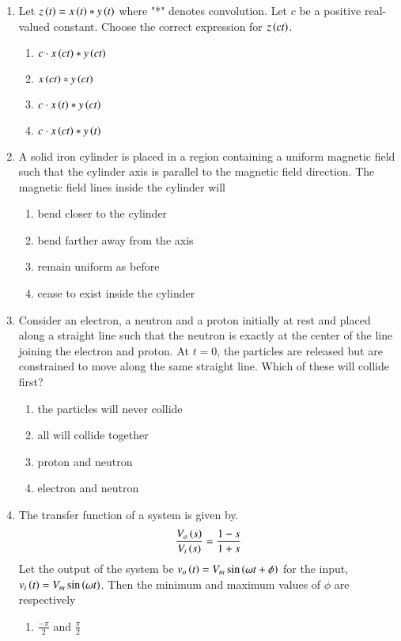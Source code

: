 \documentclass[journal,12pt,onecolumn]{IEEEtran}
\theoremstyle{remark}
\begin{document}
\begin{enumerate}
\begin{enumerate}
\end{enumerate}
\item Let $z\left(t\right)=x\left(t\right)*y\left(t\right)$ where "*" denotes convolution. Let $c$ be a positive real-valued constant. Choose the correct expression for $z\left(ct\right)$. 
\begin{enumerate}
    \item $c\cdot x\left(ct\right)*y\left(ct\right)$
    \item $x\left(ct\right)*y\left(ct\right)$
    \item $c\cdot x\left(t\right)*y\left(ct\right)$
    \item $c\cdot x\left(ct\right)*y\left(t\right)$
\end{enumerate}
\item A solid iron cylinder is placed in a region containing a uniform magnetic field such that the cylinder axis is parallel to the magnetic field direction. The magnetic field lines inside the cylinder will
\begin{enumerate}
    \item bend closer to the cylinder 
    \item bend farther away from the axis
    \item remain uniform as before 
    \item cease to exist inside the cylinder
\end{enumerate}
\item Consider an electron, a neutron and a proton initially at rest and placed along a straight line such that the neutron is exactly at the center of the line joining the electron and proton. At $t=0$, the particles are released but are constrained to move along the same straight line. Which of these will collide first? 
\begin{enumerate}
    \item the particles will never collide
    \item all will collide together
    \item proton and neutron
    \item electron and neutron
\end{enumerate}
\item The transfer function of a system is given by. $$\frac{V_o\left(s\right)}{V_i\left(s\right)}=\frac{1-s}{1+s}$$ Let the output of the system be $v_o\left(t\right)=V_m\sin\left(\omega t+\phi\right)$ for the input, $v_i\left(t\right)=V_m\sin \left(\omega t\right)$. Then the minimum and maximum values of $\phi$  are respectively
\begin{enumerate}
    \item $\frac{-\pi}{2}$ and $\frac{\pi}{2}$

\end{enumerate}
\end{enumerate}
\end{document}
